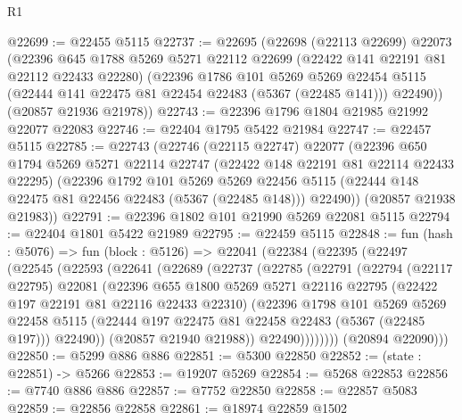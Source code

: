 \begin{lexlean}{R1}
\begin{coremodule}
@22699 := @22455 @5115
@22737 := @22695
    (@22698
      (@22113 @22699)
      @22073
      (@22396
        @645
        @1788
        @5269
        @5271
        @22112
        @22699
        (@22422 @141 @22191 @81 @22112 @22433 @22280)
        (@22396
          @1786
          @101
          @5269
          @5269
          @22454
          @5115
          (@22444 @141 @22475 @81 @22454 @22483 (@5367 (@22485 @141)))
          @22490))
      (@20857 @21936 @21978))
@22743 := @22396 @1796 @1804 @21985 @21992 @22077 @22083
@22746 := @22404 @1795 @5422 @21984
@22747 := @22457 @5115
@22785 := @22743
    (@22746
      (@22115 @22747)
      @22077
      (@22396
        @650
        @1794
        @5269
        @5271
        @22114
        @22747
        (@22422 @148 @22191 @81 @22114 @22433 @22295)
        (@22396
          @1792
          @101
          @5269
          @5269
          @22456
          @5115
          (@22444 @148 @22475 @81 @22456 @22483 (@5367 (@22485 @148)))
          @22490))
      (@20857 @21938 @21983))
@22791 := @22396 @1802 @101 @21990 @5269 @22081 @5115
@22794 := @22404 @1801 @5422 @21989
@22795 := @22459 @5115
@22848 := fun (hash : @5076) =>
  fun (block : @5126) =>
  @22041
    (@22384
      (@22395
        (@22497
          (@22545
            (@22593
              (@22641
                (@22689
                  (@22737
                    (@22785
                      (@22791
                        (@22794
                          (@22117 @22795)
                          @22081
                          (@22396
                            @655
                            @1800
                            @5269
                            @5271
                            @22116
                            @22795
                            (@22422 @197 @22191 @81 @22116 @22433 @22310)
                            (@22396
                              @1798
                              @101
                              @5269
                              @5269
                              @22458
                              @5115
                              (@22444 @197 @22475 @81 @22458 @22483 (@5367 (@22485 @197)))
                              @22490))
                          (@20857 @21940 @21988))
                        @22490))))))))
        (@20894 @22090)))
@22850 := @5299 @886 @886
@22851 := @5300 @22850
@22852 := (state : @22851) -> @5266
@22853 := @19207 @5269
@22854 := @5268 @22853
@22856 := @7740 @886 @886
@22857 := @7752 @22850
@22858 := @22857 @5083
@22859 := @22856 @22858
@22861 := @18974 @22859 @1502

\end{coremodule}
\end{lexlean}
